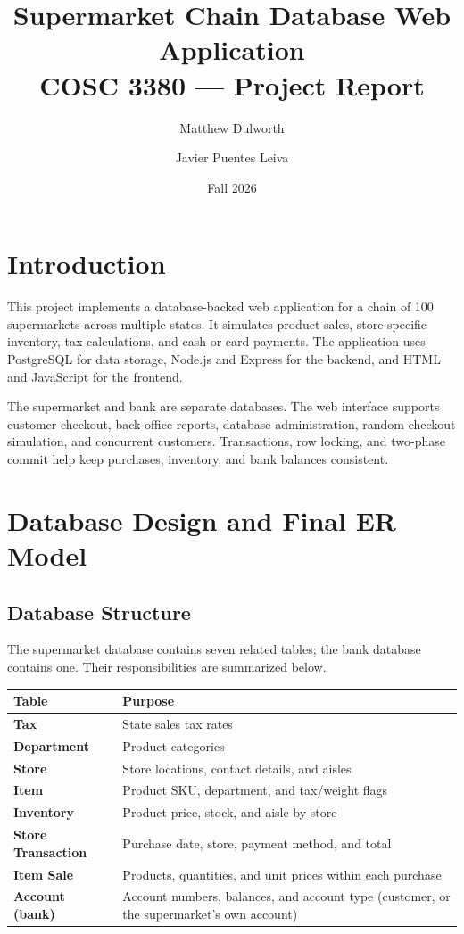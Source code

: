 \documentclass[11pt,letterpaper]{article}
\title{Supermarket Chain Database Web Application\\COSC 3380 --- Project Report}
\author{Matthew Dulworth \and Javier Puentes Leiva}
\date{Fall 2026}
\begin{document}
\maketitle

\section{Introduction}

This project implements a database-backed web application for a chain of 100 supermarkets across multiple states. It simulates product sales, store-specific inventory, tax calculations, and cash or card payments. The application uses PostgreSQL for data storage, Node.js and Express for the backend, and HTML and JavaScript for the frontend.

The supermarket and bank are separate databases. The web interface supports customer checkout, back-office reports, database administration, random checkout simulation, and concurrent customers. Transactions, row locking, and two-phase commit help keep purchases, inventory, and bank balances consistent.

\section{Database Design and Final ER Model}

\subsection{Database Structure}

The supermarket database contains seven related tables; the bank database contains one. Their responsibilities are summarized below.

\begin{center}
\small
\begin{tabularx}{\textwidth}{@{}>{\bfseries}p{}X@{}}
\hline
Table & Purpose \\ \hline
Tax & State sales tax rates \\
Department & Product categories \\
Store & Store locations, contact details, and aisles \\
Item & Product SKU, department, and tax/weight flags \\
Inventory & Product price, stock, and aisle by store \\
Store Transaction & Purchase date, store, payment method, and total \\
Item Sale & Products, quantities, and unit prices within each purchase \\
Account (bank) & Account numbers, balances, and account type (customer, or the supermarket's own account) \\ \hline
\end{tabularx}
\end{center}
\end{document}
